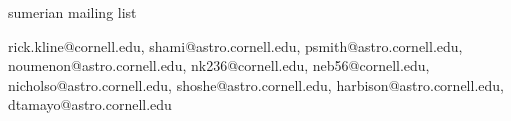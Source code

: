 sumerian mailing list

rick.kline@cornell.edu,
shami@astro.cornell.edu,
psmith@astro.cornell.edu,
noumenon@astro.cornell.edu,
nk236@cornell.edu,
neb56@cornell.edu,
nicholso@astro.cornell.edu,
shoshe@astro.cornell.edu,
harbison@astro.cornell.edu, 
dtamayo@astro.cornell.edu
